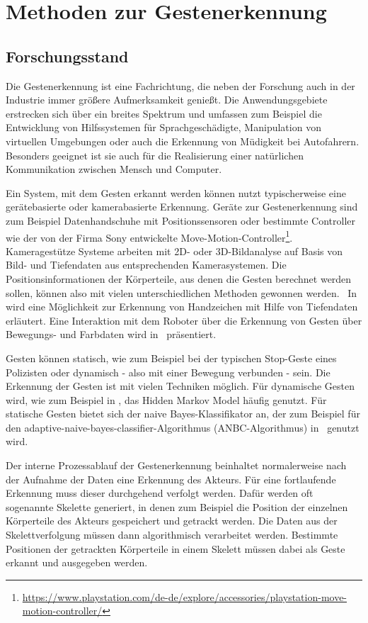 \chapter{Methoden zur Gestenerkennung}

\section{Forschungsstand}
Die Gestenerkennung ist eine Fachrichtung, die neben der Forschung auch in der Industrie immer größere Aufmerksamkeit genießt. Die Anwendungsgebiete erstrecken sich über ein breites Spektrum und umfassen zum Beispiel die Entwicklung von Hilfssystemen für Sprachgeschädigte,  Manipulation von virtuellen Umgebungen oder auch die Erkennung von Müdigkeit bei Autofahrern. Besonders geeignet ist sie auch für die Realisierung einer natürlichen Kommunikation zwischen Mensch und Computer. 

Ein System, mit dem Gesten erkannt werden können nutzt typischerweise eine gerätebasierte oder kamerabasierte Erkennung. Geräte zur Gestenerkennung sind zum Beispiel Datenhandschuhe mit Positionssensoren oder bestimmte Controller wie der von der Firma Sony entwickelte Move-Motion-Controller\footnote{\url{https://www.playstation.com/de-de/explore/accessories/playstation-move-motion-controller/}}. Kameragestütze Systeme arbeiten mit 2D- oder 3D-Bildanalyse auf Basis von Bild- und Tiefendaten aus entsprechenden Kamerasystemen. Die Positionsinformationen der Körperteile, aus denen die Gesten berechnet werden sollen, können also mit vielen unterschiedlichen Methoden gewonnen werden.~\cite{recognitionSurvey} In~\cite{depthRecognition} wird eine Möglichkeit zur Erkennung von Handzeichen mit Hilfe von Tiefendaten erläutert. Eine Interaktion mit dem Roboter über die Erkennung von Gesten über Bewegungs- und Farbdaten wird in~\cite{colorRecognition} präsentiert. 

Gesten können statisch, wie zum Beispiel bei der typischen Stop-Geste eines Polizisten oder dynamisch - also mit einer Bewegung verbunden - sein. Die Erkennung der Gesten ist mit vielen Techniken möglich. Für dynamische Gesten wird, wie zum Beispiel in \cite{hiddenMarkov}, das Hidden Markov Model häufig genutzt. Für statische Gesten bietet sich der naive Bayes-Klassifikator an, der zum Beispiel für den adaptive-naive-bayes-classifier-Algorithmus (ANBC-Algorithmus) in~\cite{gillianANBC} genutzt wird.

Der interne Prozessablauf der Gestenerkennung beinhaltet normalerweise nach der Aufnahme der Daten eine Erkennung des Akteurs. Für eine fortlaufende Erkennung muss dieser durchgehend verfolgt werden. Dafür werden oft sogenannte Skelette generiert, in denen zum Beispiel die Position der einzelnen Körperteile des Akteurs gespeichert und getrackt werden. Die Daten aus der Skelettverfolgung müssen dann algorithmisch verarbeitet werden. Bestimmte Positionen der getrackten Körperteile in einem Skelett müssen dabei als Geste erkannt und ausgegeben werden.

